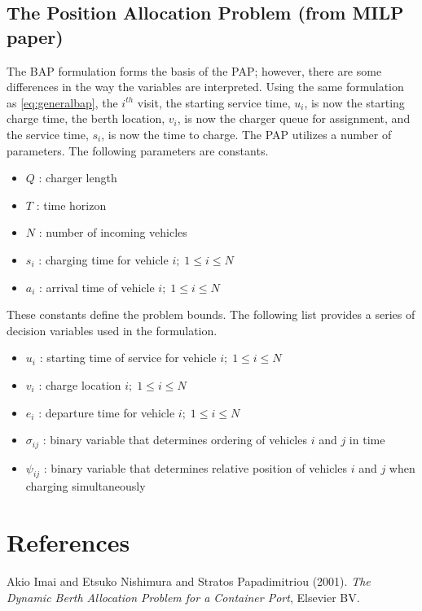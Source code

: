 \documentclass[11pt,a4paper,final]{article}
\begin{document}
\subsection{The Position Allocation Problem (from MILP paper)}
\label{sec:org5856a6e}
The BAP formulation forms the basis of the PAP; however, there are some differences in the way the variables are
interpreted. Using the same formulation as \ref{eq:generalbap}, the \(i^{th}\) visit, the starting service time, \(u_i\), is now
the starting charge time, the berth location, \(v_i\), is now the charger queue for assignment, and the service time,
\(s_i\), is now the time to charge. The PAP utilizes a number of parameters. The following parameters are constants.

\begin{itemize}
\item \(Q\)   : charger length
\item \(T\)   : time horizon
\item \(N\)   : number of incoming vehicles
\item \(s_i\) : charging time for vehicle \(i;\; 1 \leq i \leq N\)
\item \(a_i\) : arrival time of vehicle \(i;\; 1 \leq i \leq N\)
\end{itemize}

These constants define the problem bounds. The following list provides a series of decision variables used in the
formulation.

\begin{itemize}
\item \(u_i\)         : starting time of service for vehicle \(i;\; 1 \leq i \leq N\)
\item \(v_i\)         : charge location \(i;\; 1 \leq i \leq N\)
\item \(e_i\)         : departure time for vehicle \(i;\; 1 \leq i \leq N\)
\item \(\sigma_{ij}\) : binary variable that determines ordering of vehicles \(i\) and \(j\) in time
\item \(\psi_{ij}\)   : binary variable that determines relative position of vehicles \(i\) and \(j\) when charging simultaneously
\end{itemize}

\section{References}
\label{sec:org4262e70}
\noindent
Akio Imai and Etsuko Nishimura and Stratos Papadimitriou (2001). \emph{The Dynamic Berth Allocation Problem for a Container Port}, Elsevier {BV}.
\end{document}
